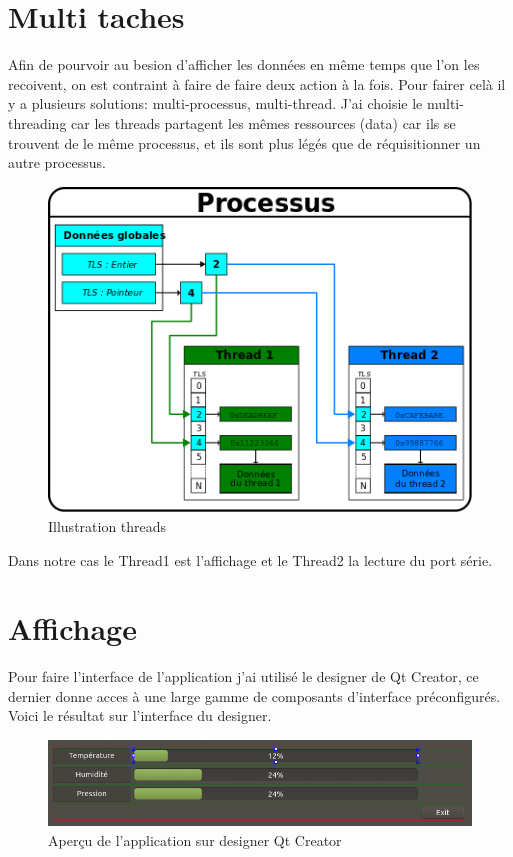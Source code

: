 \chapter{Multi taches}
Afin de pourvoir au besion d'afficher les données en même temps que l'on les recoivent, on est contraint à faire de faire deux action à la fois. \newline
Pour fairer celà il y a plusieurs solutions: multi-processus, multi-thread. \newline
J'ai choisie le multi-threading car les threads partagent les mêmes ressources (data) car ils se trouvent de le même processus, et ils sont plus légés que de réquisitionner un autre processus.

\begin{figure}[H]
	\centering
    \includegraphics[width=0.5\linewidth]{Figures/illustration_threads.png}
    \decoRule
    \caption[
    Illustration threads]{
    Illustration threads}
    \label{fig:Illustration threads}
	\end{figure}

Dans notre cas le Thread1 est l'affichage et le Thread2 la lecture du port série.


\chapter{Affichage}

Pour faire l'interface de l'application j'ai utilisé le designer de Qt Creator, ce dernier donne acces à une large gamme de composants d'interface préconfigurés. 
Voici le résultat sur l'interface du designer.

\begin{figure}[H]
	\centering
    \includegraphics[width=0.8\linewidth]{Figures/ui-app.png}
    \decoRule
    \caption[
    Aperçu de l'application sur designer Qt Creator]{
    Aperçu de l'application sur designer Qt Creator}
    \label{fig:Aperçu de l'application sur designer Qt Creator}
	\end{figure}